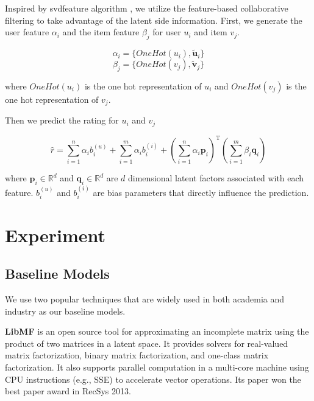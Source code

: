 \documentclass{sig-alternate-05-2015}
\begin{document}
Inspired by svdfeature algorithm \cite{chen2012svdfeature}, we utilize the feature-based
collaborative filtering to take advantage of the latent side information.
First, we generate the user feature $\alpha_{i}$ and the item feature $\beta_{j}$
for user $u_i$ and item $v_j$.

\begin{equation}
\alpha_{i} = \{ OneHot(u_i), \tilde{\mathbf{u}}_i \}
\end{equation}
\begin{equation}
\beta_{j} = \{OneHot(v_j), \tilde{\mathbf{v}}_j \}
\end{equation}

where $OneHot(u_i)$ is the one hot representation of $u_i$
and $OneHot(v_j)$ is the one hot representation of $v_j$.

Then we predict the rating for $u_i$ and $v_j$

\begin{equation}
\hat{r} = \sum_{i=1}^{n} \alpha_{i} b_{i}^{(u)} + \sum_{i=1}^{m} \alpha_{i} b_{i}^{(i)} +
\left( \sum_{i=1}^{n} \alpha_{i} \textbf{p}_{i} \right) ^ \mathrm{T}
\left( \sum_{i=1}^{m} \beta_{i} \textbf{q}_{i} \right)
\end{equation}

where $\textbf{p}_{i} \in \mathbb{R}^d$ and $\textbf{q}_{i} \in \mathbb{R}^d$
are $d$ dimensional latent factors associated with each feature.
$b_{i}^{(u)}$ and $b_{i}^{(i)}$ are bias parameters that directly influence the prediction.


\section{Experiment}

\subsection{Baseline Models}
We use two popular techniques that are widely used
in both academia and industry as our baseline models.

\textbf{LibMF} is an open source tool
for approximating an incomplete matrix using the product of
two matrices in a latent space.
It provides solvers for real-valued matrix factorization,
binary matrix factorization, and one-class matrix factorization.
It also supports parallel computation in a multi-core machine
using CPU instructions (e.g., SSE) to accelerate vector operations.
Its paper \cite{chin2015fast} won the best paper award
in RecSys 2013.
\end{document}
